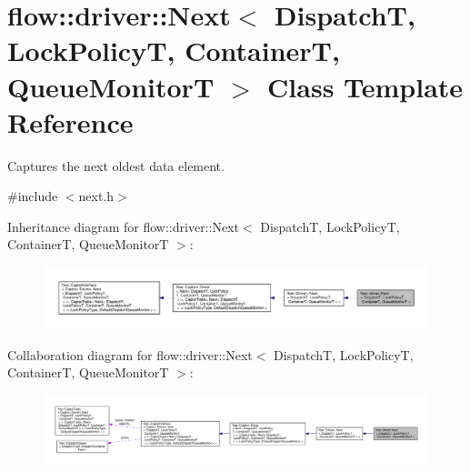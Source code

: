 \hypertarget{classflow_1_1driver_1_1_next}{}\section{flow\+:\+:driver\+:\+:Next$<$ DispatchT, Lock\+PolicyT, ContainerT, Queue\+MonitorT $>$ Class Template Reference}
\label{classflow_1_1driver_1_1_next}


Captures the next oldest data element.  




{\ttfamily \#include $<$next.\+h$>$}



Inheritance diagram for flow\+:\+:driver\+:\+:Next$<$ DispatchT, Lock\+PolicyT, ContainerT, Queue\+MonitorT $>$\+:
\nopagebreak
\begin{figure}[H]
\begin{center}
\leavevmode
\includegraphics[width=350pt]{classflow_1_1driver_1_1_next__inherit__graph}
\end{center}
\end{figure}


Collaboration diagram for flow\+:\+:driver\+:\+:Next$<$ DispatchT, Lock\+PolicyT, ContainerT, Queue\+MonitorT $>$\+:
\nopagebreak
\begin{figure}[H]
\begin{center}
\leavevmode
\includegraphics[width=350pt]{classflow_1_1driver_1_1_next__coll__graph}
\end{center}
\end{figure}
